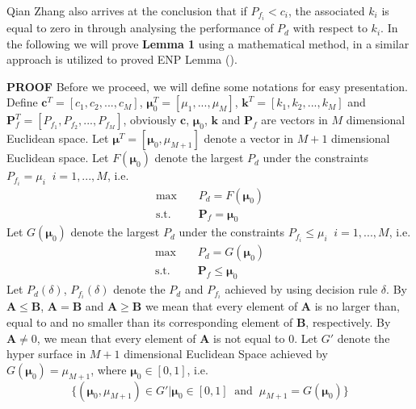 Qian Zhang also arrives at the conclusion that if $P_{f_i} < c_i$, the associated $k_i$ is equal to zero in \cite{zhang1999design, zhang2000efficient} through analysing the performance of $P_d$ with respect to $k_i$. In the following we will prove \textbf{Lemma 1} using a mathematical method, in \cite{LehmannTest, dantzig1951fundamental} a similar approach is utilized to proved ENP Lemma ().

\noindent\textbf{PROOF}
\newcommand{\bmu}{\boldsymbol{\mu}}
Before we proceed, we will define some notations for easy presentation.
Define $\mathbf{c}^T = [c_1, c_2, ..., c_M]$, $\boldsymbol{\mu}_0^T = [\mu_1, ..., \mu_M]$, $\mathbf{k}^T = [k_1, k_2, ..., k_M]$ and  $\mathbf{P}_f^T = [P_{f_1}, P_{f_2}, ..., P_{f_M}]$, obviously $\mathbf{c}$, $\bmu_0$, $\mathbf{k}$ and $\mathbf{P}_f$ are vectors in $M$ dimensional Euclidean  space. Let $\bmu^T = [\bmu_0, \mu_{M+1}]$ denote a vector in $M+1$ dimensional Euclidean space. 
Let $F(\boldsymbol{\mu}_0)$ denote the largest $P_d$ under the constraints $P_{f_i} = \mu_i\;\;i = 1, ..., M$, i.e.
\begin{equation}
\label{def: F}
\begin{split}
\max&\;\;\;\;P_d = F(\bmu_0)\\
\text{s.t.}&\;\;\;\;\mathbf{P}_f = \bmu_0
\end{split}
\end{equation}
Let $G(\boldsymbol{\mu}_0)$ denote the largest $P_d$ under the constraints $P_{f_i} \leq \mu_i\;\;i = 1, ..., M$, i.e.
\begin{equation}
\begin{split}
\label{def: function G}
\max&\;\;\;\;P_d = G(\bmu_0)\\
\text{s.t.}&\;\;\;\;\mathbf{P}_f \leq \bmu_0
\end{split}
\end{equation}
Let $P_d(\delta)$, $P_{f_i}(\delta)$ denote the $P_d$ and $P_{f_i}$ achieved by using decision rule $\delta$.
By $\mathbf{A} \leq \mathbf{B}$, $\mathbf{A} = \mathbf{B}$ and  $\mathbf{A} \geq \mathbf{B}$ we mean that every element of $\mathbf{A}$ is no larger than, equal to and no smaller than its corresponding element of $\mathbf{B}$, respectively. 
By $\mathbf{A} \neq 0$, we mean that every element of $\mathbf{A}$ is not equal to $0$. 
Let $G'$ denote the hyper surface in $M+1$ dimensional Euclidean Space achieved by $G(\bmu_0) = \mu_{M+1}$, where $\bmu_0 \in [0, 1]$, i.e.
\begin{equation}
\label{def: G'}
\{(\bmu_0, \mu_{M+1}) \in G' | \bmu_0 \in [0, 1] \;\;\text{and}\;\;\mu_{M+1} = G(\bmu_0) \}
\end{equation}
